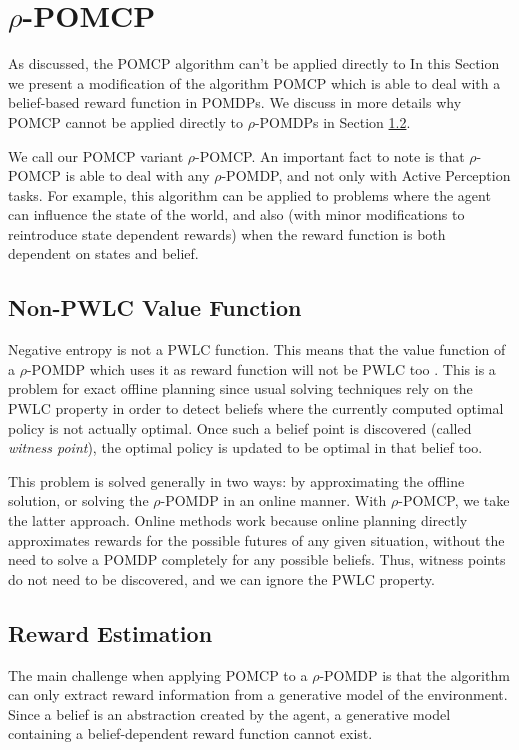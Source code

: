\section{$\rho$-POMCP}

As discussed, the POMCP algorithm can't be applied directly to In this Section we present a modification of the algorithm POMCP which is able to deal with a
belief-based reward function in POMDPs. We discuss in more details why POMCP cannot be applied
directly to $\rho$-POMDPs in Section \ref{ref:rewestimation}.

We call our POMCP variant $\rho$-POMCP. An important fact to note is that $\rho$-POMCP is able to deal
with any $\rho$-POMDP, and not only with Active Perception tasks. For example, this algorithm can be
applied to problems where the agent can influence the state of the world, and also (with minor
modifications to reintroduce state dependent rewards) when the reward function is both dependent on
states and belief.

\subsection{Non-PWLC Value Function}

Negative entropy is not a PWLC function. This means that the value function of a $\rho$-POMDP which
uses it as reward function will not be PWLC too \cite{cit:rpomdp}. This is a problem for exact
offline planning since usual solving techniques rely on the PWLC property in order to detect beliefs
where the currently computed optimal policy is not actually optimal. Once such a belief point is
discovered (called \textit{witness point}), the optimal policy is updated to be optimal in that
belief too.

This problem is solved generally in two ways: by approximating the offline solution, or solving the
$\rho$-POMDP in an online manner. With $\rho$-POMCP, we take the latter approach. Online methods
work because online planning directly approximates rewards for the possible futures of any given
situation, without the need to solve a POMDP completely for any possible beliefs. Thus, witness
points do not need to be discovered, and we can ignore the PWLC property.

\subsection{Reward Estimation}\label{ref:rewestimation}

The main challenge when applying POMCP to a $\rho$-POMDP is that the algorithm can only extract
reward information from a generative model of the environment. Since a belief is an abstraction
created by the agent, a generative model containing a belief-dependent reward function cannot exist.

